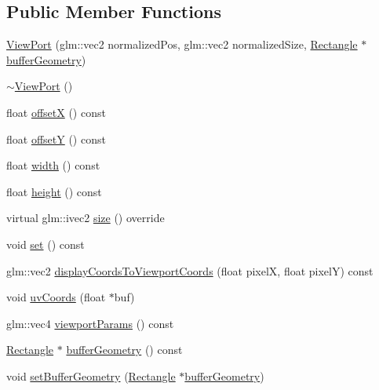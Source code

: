 \subsection*{Public Member Functions}
\begin{DoxyCompactItemize}
\item 
\hyperlink{classmotorcar_1_1ViewPort_a5570e53ae858a60741c158fc2cd06aaf}{View\-Port} (glm\-::vec2 normalized\-Pos, glm\-::vec2 normalized\-Size, \hyperlink{structmotorcar_1_1Geometry_1_1Rectangle_af8ec2dc746ed046045d14d31a4973b2e}{Rectangle} $\ast$\hyperlink{classmotorcar_1_1ViewPort_ac1ad41f301d3b13dfec141e6395ab17f}{buffer\-Geometry})
\item 
\hyperlink{classmotorcar_1_1ViewPort_aa348ae944a31ca772ba382929f764fab}{$\sim$\-View\-Port} ()
\item 
float \hyperlink{classmotorcar_1_1ViewPort_ae0e423f6dfbb1d61545845212df22218}{offset\-X} () const 
\item 
float \hyperlink{classmotorcar_1_1ViewPort_a6fe2deea9150dd656295e0cd64620e3b}{offset\-Y} () const 
\item 
float \hyperlink{classmotorcar_1_1ViewPort_ac86ee4251c6ba96a148bf768fa2dec65}{width} () const 
\item 
float \hyperlink{classmotorcar_1_1ViewPort_aa9bd5b63fc28eb8fc013dab6e71d6705}{height} () const 
\item 
virtual glm\-::ivec2 \hyperlink{classmotorcar_1_1ViewPort_a50e51ee6e264f85f6f0e1c43950e74ce}{size} () override
\item 
void \hyperlink{classmotorcar_1_1ViewPort_aea3f9edff1e707048030a458ae7746d8}{set} () const 
\item 
glm\-::vec2 \hyperlink{classmotorcar_1_1ViewPort_a78953a63d35d05c96e922683f994d441}{display\-Coords\-To\-Viewport\-Coords} (float pixel\-X, float pixel\-Y) const 
\item 
void \hyperlink{classmotorcar_1_1ViewPort_af386def5d599b02e6a15b25d59b922b3}{uv\-Coords} (float $\ast$buf)
\item 
glm\-::vec4 \hyperlink{classmotorcar_1_1ViewPort_a49402599a6e6ada465d22b26be597ce5}{viewport\-Params} () const 
\item 
\hyperlink{structmotorcar_1_1Geometry_1_1Rectangle_af8ec2dc746ed046045d14d31a4973b2e}{Rectangle} $\ast$ \hyperlink{classmotorcar_1_1ViewPort_ac1ad41f301d3b13dfec141e6395ab17f}{buffer\-Geometry} () const 
\item 
void \hyperlink{classmotorcar_1_1ViewPort_a2260865ee7557a1a6245ea77ff876857}{set\-Buffer\-Geometry} (\hyperlink{structmotorcar_1_1Geometry_1_1Rectangle_af8ec2dc746ed046045d14d31a4973b2e}{Rectangle} $\ast$\hyperlink{classmotorcar_1_1ViewPort_ac1ad41f301d3b13dfec141e6395ab17f}{buffer\-Geometry})
\end{DoxyCompactItemize}
